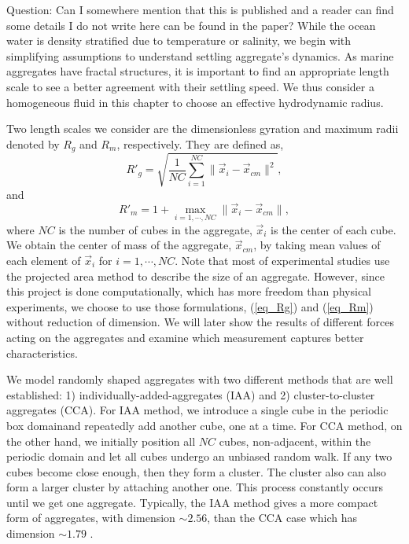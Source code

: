 %
{\color{red} Question: Can I somewhere mention that this is published and a reader can find some details I do not write here can be found in the paper?}
While the ocean water is density stratified due to temperature or salinity, we begin with simplifying assumptions to understand settling aggregate's dynamics. As marine aggregates have fractal structures, it is important to find an appropriate length scale to see a better agreement with their settling speed. We thus consider a homogeneous fluid in this chapter to choose an effective hydrodynamic radius. 
\par
Two length scales we consider are the dimensionless gyration and maximum radii denoted by $R_g$ and $R_m$, respectively. They are defined as,
\begin{equation}
{R'}_g  = \sqrt{\frac{1}{NC} \sum_{i=1}^{NC} \| \vec{x}_i - \vec{x}_{cm} \|^2},
\label{eq_Rg}
\end{equation}
and
\begin{equation}
{R'}_m = 1+ \max_{i = 1, \cdots, NC} \| \vec{x}_i - \vec{x}_{cm} \|,
\label{eq_Rm}
\end{equation}
where $NC$ is the number of cubes in the aggregate, $\vec{x}_i$ is the center of each cube.
We obtain the center of mass of the aggregate, $\vec{x}_{cm}$, by taking mean values of each element of $\vec{x}_i$ for $i = 1, \cdots, NC$.
Note that most of experimental studies use the projected area method to describe the size of an aggregate. However, since this project is done computationally, which has more freedom than physical experiments, we choose to use those formulations, (\ref{eq_Rg}) and (\ref{eq_Rm}) without reduction of dimension.
We will later show the results of different forces acting on the aggregates and examine which measurement captures better characteristics.
\par
We model randomly shaped aggregates with two different methods that are well established: 1) individually-added-aggregates (IAA) and 2) cluster-to-cluster aggregates (CCA). 
For IAA method, we introduce a single cube in the periodic box domainand  repeatedly add another cube, one at a time. For CCA method, on the other hand, we initially position all $NC$ cubes, non-adjacent, within the periodic domain and let all cubes undergo an unbiased random walk. If any two cubes become close enough, then they form a cluster. The cluster also can also form a larger cluster by attaching another one. 
This process constantly occurs until we get one aggregate. 
Typically, the IAA method gives a more compact form of aggregates, with dimension $\sim 2.56$, than the CCA case which has dimension $\sim 1.79$ \cite{witten_diffusion-limited_1981, kaye_random_2008}.

